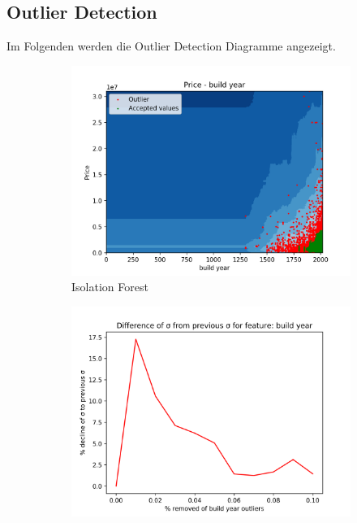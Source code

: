 \subsection{Outlier Detection}
Im Folgenden werden die Outlier Detection Diagramme angezeigt.
\begin{figure}[H]
\begin{subfigure}{.5\textwidth}
\centering
  \includegraphics[width=\linewidth]{images/anhang/outlier_detection/build_year_IsolationForest.png}
  \caption{Isolation Forest}
\end{subfigure}
\begin{subfigure}{.5\textwidth}
  \centering
  \includegraphics[width=\linewidth]{images/anhang/outlier_detection/build_year_diff_of_std.png}

\end{subfigure}
\end{figure}
